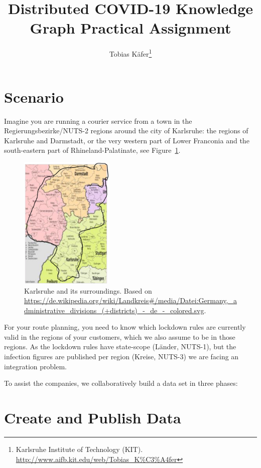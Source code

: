 \documentclass[DIV=12]{scrartcl}
\author{Tobias Käfer\thanks{Karlsruhe Institute of Technology (KIT). \url{http://www.aifb.kit.edu/web/Tobias_K\%C3\%A4fer}}}
\title{Distributed COVID-19 Knowledge Graph Practical Assignment}
\begin{document}
\maketitle


\section*{Scenario}

Imagine you are running a courier service from a town in the Regierungsbezirke/NUTS-2 regions around the city of Karlsruhe: the regions of Karlsruhe and Darmstadt, or the very western part of Lower Franconia and the south-eastern part of Rhineland-Palatinate, see Figure~\ref{fig:karlsruhe-surroundings}.

\begin{figure}[h]
\centering
\includegraphics[width=0.4\textwidth]{karlsruhe-surroundings}
\caption{Karlsruhe and its surroundings. Based on {\tiny \url{https://de.wikipedia.org/wiki/Landkreis\#/media/Datei:Germany,_administrative_divisions_(+districts)_-_de_-_colored.svg}}.\label{fig:karlsruhe-surroundings}}
\end{figure}

For your route planning, you need to know which lockdown rules are currently valid in the regions of your customers, which we also assume to be in those regions.
As the lockdown rules have state-scope (Länder, NUTS-1), but the infection figures are published per region (Kreise, NUTS-3) we are facing an integration problem.

To assist the companies, we collaboratively build a data set in three phases:

\section{Create and Publish Data}
\end{document}
